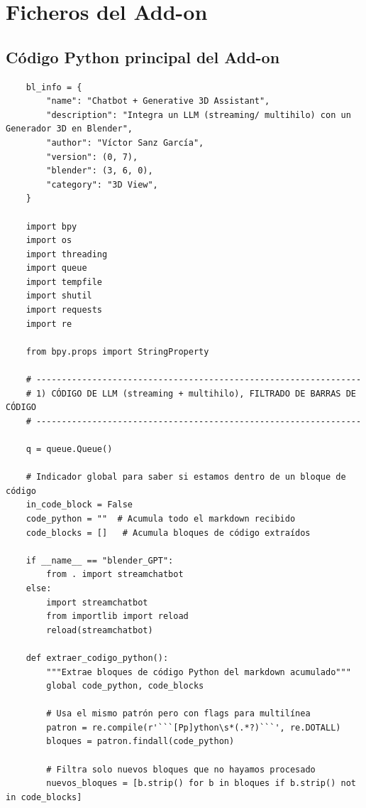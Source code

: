 \chapter{Ficheros del Add-on}
\section{Código Python principal del Add-on}
\label{sec:puntoA1}

\captionsetup{type=listing}
\label{lst:panelAddon1}
\begin{verbatim}
    bl_info = {
        "name": "Chatbot + Generative 3D Assistant",
        "description": "Integra un LLM (streaming/ multihilo) con un Generador 3D en Blender",
        "author": "Víctor Sanz García",
        "version": (0, 7),
        "blender": (3, 6, 0),
        "category": "3D View",
    }
    
    import bpy
    import os
    import threading
    import queue
    import tempfile
    import shutil
    import requests
    import re
    
    from bpy.props import StringProperty
    
    # ----------------------------------------------------------------
    # 1) CÓDIGO DE LLM (streaming + multihilo), FILTRADO DE BARRAS DE CÓDIGO
    # ----------------------------------------------------------------
    
    q = queue.Queue()
    
    # Indicador global para saber si estamos dentro de un bloque de código
    in_code_block = False
    code_python = ""  # Acumula todo el markdown recibido
    code_blocks = []   # Acumula bloques de código extraídos
    
    if __name__ == "blender_GPT":
        from . import streamchatbot
    else:
        import streamchatbot
        from importlib import reload
        reload(streamchatbot)
    
    def extraer_codigo_python():
        """Extrae bloques de código Python del markdown acumulado"""
        global code_python, code_blocks
        
        # Usa el mismo patrón pero con flags para multilínea
        patron = re.compile(r'```[Pp]ython\s*(.*?)```', re.DOTALL)
        bloques = patron.findall(code_python)
        
        # Filtra solo nuevos bloques que no hayamos procesado
        nuevos_bloques = [b.strip() for b in bloques if b.strip() not in code_blocks]
        

\end{verbatim}
